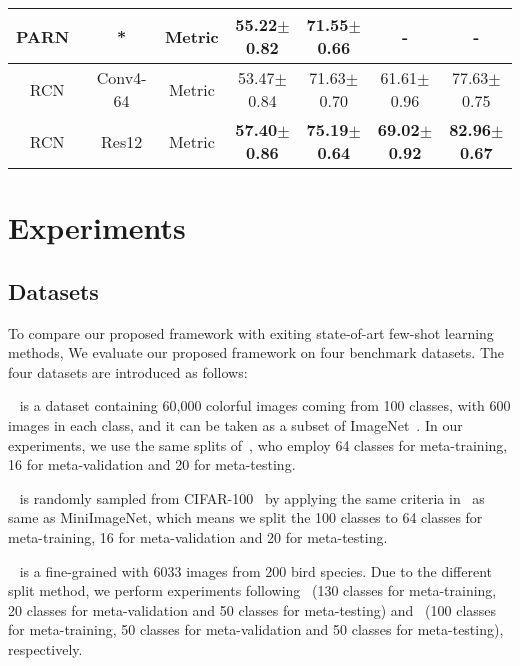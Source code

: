 \documentclass[letterpaper]{article}
\begin{document}
\begin{table*}
\begin{center}
{\begin{tabular}{c c c c c c c}
   PARN~\cite{wu2019parn} & * & Metric & 55.22$\pm$0.82 & 71.55$\pm$0.66 & - & -\\
  \hline
   RCN& Conv4-64 & Metric & 53.47$\pm$0.84 & 71.63$\pm$0.70 & 61.61$\pm$0.96 & 77.63$\pm$0.75\\
   RCN& Res12& Metric & \textbf{57.40$\pm$0.86} & \textbf{75.19$\pm$0.64} & \textbf{69.02$\pm$0.92} & \textbf{82.96$\pm$0.67} \\
  \hline
\end{tabular}}
\label{table: mini}
\end{center}
\end{table*}

\section{Experiments}\label{section: Experiments}

\subsection{Datasets}
To compare our proposed framework with exiting state-of-art few-shot learning methods, We evaluate our proposed framework on four benchmark datasets. The four datasets are introduced as follows: 

~\cite{VinyalsMatching}
 is a dataset containing 60,000 colorful images coming from 100 classes, with 600 images in each class, and it can be taken as a subset of ImageNet~\cite{deng2009imagenet}. In our experiments, we use the same splits of~\cite{snell2017prototypical}, who employ 64 classes for meta-training, 16 for meta-validation and 20 for meta-testing.

~\cite{bertinetto2018meta} is randomly sampled from CIFAR-100~\cite{krizhevsky2009learning} by applying the same criteria in~\cite{bertinetto2018meta} as same as MiniImageNet, which means we split the 100 classes to 64 classes for meta-training, 16 for meta-validation and 20 for meta-testing. 

~\cite{welinder2010cub} is a fine-grained with 6033 images from
200 bird species. Due to the different split method, we perform experiments following~\cite{li2019revisiting} (130 classes for meta-training, 20 classes for meta-validation and 50 classes for meta-testing) and~\cite{chen2019closerfewshot} (100 classes for meta-training, 50 classes for meta-validation and 50 classes for meta-testing), respectively.
\end{document}

